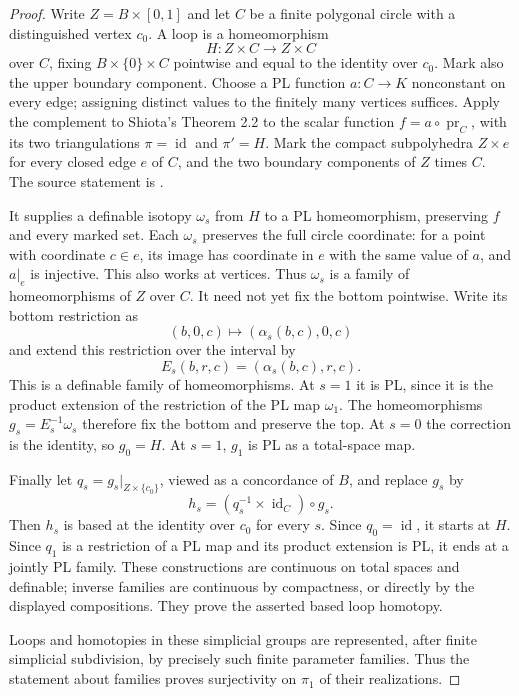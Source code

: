 \begin{proof}
Write $Z=B\times[0,1]$ and let $C$ be a finite polygonal circle
with a distinguished vertex $c_0$. A loop is a homeomorphism
\[
 H:Z\times C\longrightarrow Z\times C
\]
over $C$, fixing $B\times\{0\}\times C$ pointwise and equal to
the identity over $c_0$. Mark also the upper boundary component.
Choose a PL function $a:C\to K$ nonconstant on every edge; assigning
distinct values to the finitely many vertices suffices. Apply the
complement to Shiota's Theorem 2.2 to the scalar function
$f=a\circ\operatorname{pr}_C$, with its two triangulations
$\pi=\operatorname{id}$ and $\pi'=H$. Mark the compact subpolyhedra
$Z\times e$ for every closed edge $e$ of $C$, and the two boundary
components of $Z$ times $C$. The source statement is
\cite[Theorem 2.2, Complement, p.~7]{Shiota2010}.

It supplies a definable isotopy $\omega_s$ from $H$ to a PL
homeomorphism, preserving $f$ and every marked set. Each $\omega_s$
preserves the full circle coordinate: for a point with coordinate
$c\in e$, its image has coordinate in $e$ with the same value of
$a$, and $a|_e$ is injective. This also works at vertices.
Thus $\omega_s$ is a family of homeomorphisms of $Z$ over $C$.
It need not yet fix the bottom pointwise. Write its bottom
restriction as
\[
 (b,0,c)\longmapsto(\alpha_s(b,c),0,c)
\]
and extend this restriction over the interval by
\[
 E_s(b,r,c)=(\alpha_s(b,c),r,c).
\]
This is a definable family of homeomorphisms. At $s=1$ it is
PL, since it is the product extension of the restriction of the
PL map $\omega_1$. The homeomorphisms
$g_s=E_s^{-1}\omega_s$ therefore fix the bottom and preserve the
top. At $s=0$ the correction is the identity, so $g_0=H$.
At $s=1$, $g_1$ is PL as a total-space map.

Finally let $q_s=g_s|_{Z\times\{c_0\}}$, viewed as a concordance
of $B$, and replace $g_s$ by
\[
 h_s=(q_s^{-1}\times\operatorname{id}_C)\circ g_s.
\]
Then $h_s$ is based at the identity
over $c_0$ for every $s$. Since $q_0=\operatorname{id}$, it starts
at $H$. Since $q_1$ is a restriction of a PL map and its product
extension is PL, it ends at a jointly PL family. These constructions
are continuous on total spaces and definable; inverse families
are continuous by compactness, or directly by the displayed
compositions. They prove the asserted based loop homotopy.

Loops and homotopies in these simplicial groups are represented,
after finite simplicial subdivision, by precisely such finite
parameter families. Thus the statement about families proves
surjectivity on $\pi_1$ of their realizations.


\end{proof}
